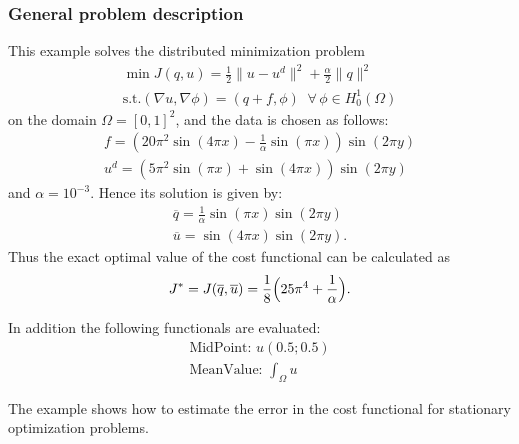 \subsubsection{General problem description}
This example solves the distributed minimization problem
\begin{gather*}
\min J(q,u) = \frac{1}{2} \|u-u^d\|^2 + \frac{\alpha}{2}\|q\|^2\\
\text{s.t.} (\nabla u,\nabla \phi) = (q+f,\phi)\;\;\forall\,\phi \in H^1_0(\Omega)
\end{gather*}
on the domain $\Omega = [0,1]^2$, and the data is chosen as follows:
\begin{gather*}
 f = \left(20\pi^2  \sin(4 \pi x) - \frac{1}{\alpha}  \sin(\pi x)\right) \sin(2 \pi y)\\
 u^d = \left( 5 \pi^2 \sin(\pi x) + \sin(4 \pi x)\right)  \sin(2\pi y)
\end{gather*}
and $\alpha = 10^{-3}$.
Hence its solution is given by:
\begin{gather*}
 \overline{q} = \frac{1}{\alpha} \sin(\pi x) \sin(2 \pi y)\\
 \overline{u} = \sin(4 \pi x) \sin(2 \pi y).
\end{gather*}
Thus the exact optimal value of the cost functional can be calculated as 
\begin{gather*}
 J^* = J(\overline{q},\overline{u}) = \frac{1}{8}\Bigl(25\pi^4 + \frac{1}{\alpha}\Bigr).
\end{gather*}

In addition the following functionals are evaluated:
\begin{gather*}
  \text{MidPoint: } u(0.5 ; 0.5)\\[2mm]
  \text{MeanValue: }\int_\Omega u
\end{gather*}

The example shows how to estimate the error in the cost functional for stationary optimization
problems.

